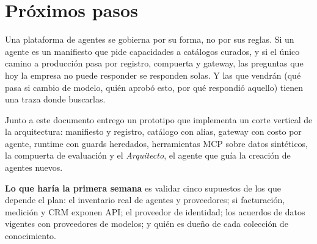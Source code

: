 \section{Próximos pasos}
\label{sec:cierre}
Una plataforma de agentes se gobierna por su forma, no por sus reglas. Si un agente es un
manifiesto que pide capacidades a catálogos curados, y si el único camino a producción pasa
por registro, compuerta y gateway, las preguntas que hoy la empresa no puede responder se responden
solas. Y las que vendrán (qué pasa si cambio de modelo, quién aprobó esto, por qué respondió
aquello) tienen una traza donde buscarlas.

Junto a este documento entrego un prototipo que implementa un corte vertical de la
arquitectura: manifiesto y registro, catálogo con alias, gateway con costo por agente,
runtime con guards heredados, herramientas MCP sobre datos sintéticos, la compuerta de
evaluación y el \emph{Arquitecto}, el agente que guía la creación de agentes nuevos.

\textbf{Lo que haría la primera semana} es validar cinco supuestos de los que depende el
plan: el inventario real de agentes y proveedores; si facturación, medición y CRM exponen
API; el proveedor de identidad; los acuerdos de datos vigentes con proveedores de modelos; y
quién es dueño de cada colección de conocimiento.
